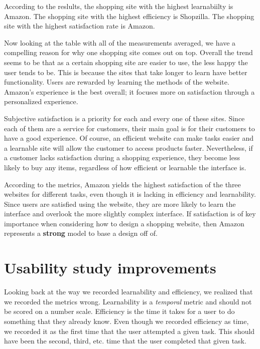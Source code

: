\documentclass[11pt, oneside]{article}
\begin{document}
According to the reslults, the shopping site with the highest learnabiilty is Amazon. The shopping site with the highest efficiency is Shopzilla. The shopping site with the highest satisfaction rate is Amazon.

Now looking at the table with all of the measurements averaged, we have a compelling reason for why one shopping site comes out on top. Overall the trend seems to be that as a certain shopping site are easier to use, the less happy the user tends to be. This is because the sites that take longer to learn have better functionality. Users are rewarded by learning the methods of the website. Amazon's experience is the best overall; it focuses more on satisfaction through a personalized experience.

Subjective satisfaction is a priority for each and every one of these sites. Since each of them are a service for customers, their main goal is for their customers to have a good experience. Of course, an efficient website can make  tasks easier and a learnable site will allow the customer to access products faster. Nevertheless, if a customer lacks satisfaction during a shopping experience, they become less likely to buy any items, regardless of how efficient or learnable the interface is. 

According to the metrics, Amazon yields the highest satisfaction of the three websites for different tasks, even though it is lacking in efficiency and learnability. Since users are satisfied using the website, they are more likely to learn the interface and overlook the more slightly complex interface. If satisfaction is of key importance when considering how to design a shopping website, then Amazon represents a \textbf{strong} model to base a design off of.

\section{Usability study improvements}

Looking back at the way we recorded learnability and efficiency, we realized that we recorded the metrics wrong. Learnability is a \textit{temporal} metric and should not be scored on a number scale. Efficiency is the time it takes for a user to do something that they already know. Even though we recorded efficiency as time, we recorded it as the first time that the user attempted a given task. This should have been the second, third, etc. time that the user completed that given task.
\end{document}
